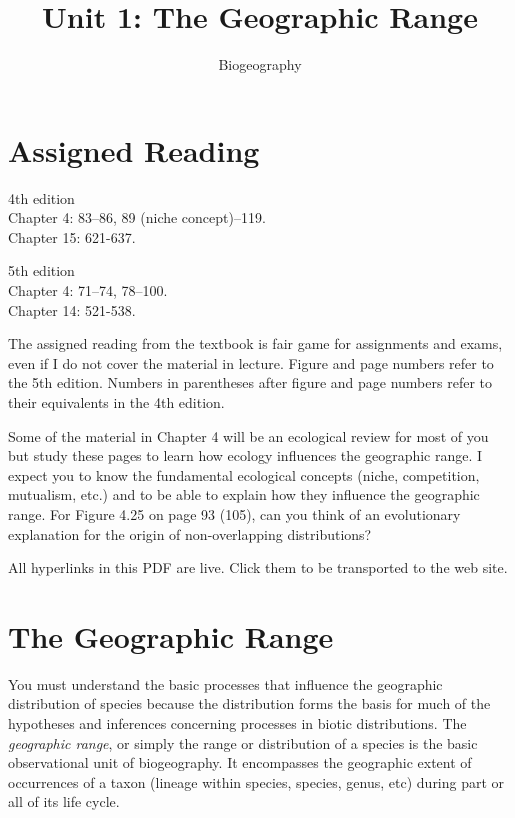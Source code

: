 \documentclass[11pt, hidelinks]{article}
\title{Unit 1: The Geographic Range}
\author{Biogeography}
\date{}
\begin{document}
\maketitle
\section{Assigned Reading}
\begin{multicols}{2}
4th edition\\
Chapter 4: 83--86, 89 (niche concept)--119. \\
Chapter 15: 621-637.

\columnbreak

5th edition\\
Chapter 4: 71--74, 78--100. \\
Chapter 14: 521-538.
\end{multicols}


The assigned reading from the textbook is fair game for assignments and exams, even if I do not cover the material in  lecture. Figure and page numbers refer to the 5th edition. Numbers in parentheses after figure and page numbers refer to their equivalents in the 4th edition. 

Some of the material in Chapter 4 will be an ecological review for most of you but study these pages to learn how ecology influences the geographic range.  I expect you to know the fundamental ecological concepts (niche, competition, mutualism, etc.) and to be able to explain how they influence the geographic range.  For Figure 4.25 on page 93 (105), can you think of an evolutionary explanation for the origin of non-overlapping distributions?

All hyperlinks in this PDF are live. Click them to be transported to the web site.

\section{The Geographic Range}

You must understand the basic processes that influence the geographic distribution of species because the distribution forms the basis for much of the hypotheses and inferences concerning processes in biotic distributions. The \emph{geographic range}, or simply the range or distribution of a species is the basic observational unit of biogeography. It encompasses the geographic extent of occurrences of a taxon (lineage within species, species, genus, etc) during part or all of its life cycle. 
\end{document}
